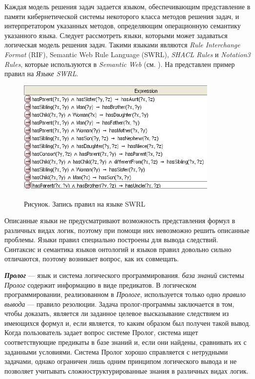 Каждая модель решения задач задается языком, обеспечивающим представление в памяти кибернетической системы некоторого класса методов решения задач, и интерпретатором указанных методов, определяющим операционную семантику указанного языка. Следует рассмотреть языки, которыми может задаваться логическая модель решения задач. Такими языками являются \textit{Rule Interchange Format} (RIF), Semantic Web Rule Language (SWRL), \textit{SHACL Rules} и \textit{Notation3 Rules}, которые используются в \textit{Semantic Web} (см. ). На \textit{} представлен пример правил на \textit{Языке SWRL}.

\begin{figure}[H]
	\caption{Рисунок. Запись правил на языке SWRL}
	\includegraphics[scale=0.8]{author/part3/figures/swrl_example.png}
	\label{fig:swrl_example}
\end{figure}

Описанные языки не предусматривают возможность представления формул в различных видах логик, поэтому при помощи них невозможно решить описанные проблемы. Языки правил специально построены для вывода следствий. Синтаксис и семантика языков онтологий и языков правил довольно сильно отличаются, поэтому возникает вопрос, как их совмещать. 

\textbf{\textit{Пролог}} --- язык и система логического программирования. \textit{база знаний} системы \textit{Пролог} содержит информацию в виде предикатов. В логическом программировании, реализованном в \textit{Прологе}, используется только одно \textit{правило вывода} --- правило резолюции. Задача пролог-программы заключается в том, чтобы доказать, является ли заданное целевое высказывание следствием из имеющихся формул и, если является, то каким образом был получен такой вывод. Когда пользователь задает вопрос системе Пролог, система ищет соответствующие предикаты в базе знаний и, если они найдены, сравнивать их с заданными условиями. Система Пролог хорошо справляется с нетрудными задачами, однако ограничен лишь одним принципом логического вывода и не позволяет учитывать сложноструктурированные знания в различных видах логик.

